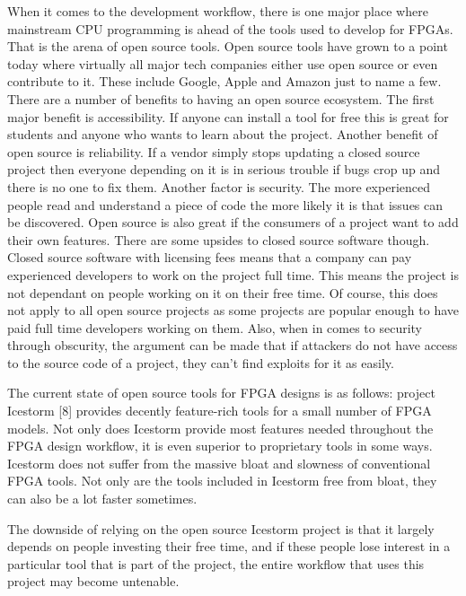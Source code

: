 \documentclass{article}
\begin{document}
    When it comes to the development workflow, there is one major place where mainstream CPU programming
    is ahead of the tools used to develop for FPGAs. That is the arena of open source tools.
    Open source tools have grown to a point today where virtually all major tech companies
    either use open source or even contribute to it. These include Google, Apple and Amazon
    just to name a few.
    There are a number of benefits to having an open source ecosystem. The first major
    benefit is accessibility. If anyone can install a tool for free this is great
    for students and anyone who wants to learn about the project.
    Another benefit of open source is reliability. If a vendor simply stops updating a closed
    source project then everyone depending on it is in serious trouble if bugs
    crop up and there is no one to fix them.
    Another factor is security. The more experienced people read and understand a piece of
    code the more likely it is that issues can be discovered.
    Open source is also great if the consumers of a project want to add their own features.
    There are some upsides to closed source software though. Closed source software with
    licensing fees means that a company can pay experienced developers to work on the project full
    time. This means the project is not dependant on people working on it on their free time.
    Of course, this does not apply to all open source projects as some projects are popular
    enough to have paid full time developers working on them.
    Also, when in comes to security through obscurity, the argument can be made that
    if attackers do not have access to the source code of a project, they can't find
    exploits for it as easily.

    The current state of open source tools for FPGA designs is as follows:
    project Icestorm [8] provides decently feature-rich tools for a small number of FPGA
    models. Not only does Icestorm provide most features needed throughout the FPGA
    design workflow, it is even superior to proprietary tools in some ways. Icestorm
    does not suffer from the massive bloat and slowness of conventional FPGA tools.
    Not only are the tools included in Icestorm free from bloat, they can also be
    a lot faster sometimes.

    The downside of relying on the open source Icestorm project is that it largely depends
    on people investing their free time, and if these people lose interest in a particular
    tool that is part of the project, the entire workflow that uses this project
    may become untenable.
        
\end{document}
